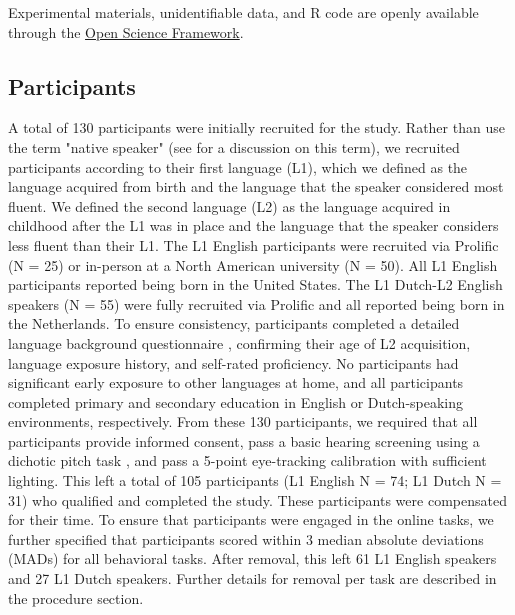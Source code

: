 Experimental materials, unidentifiable data, and R code are openly available through the 
\href{https://osf.io/wa4gv/?view_only=de113dbced6b46fab96ca8217b3c1ca6}{Open Science Framework}.


\subsection{Participants}
A total of 130 participants were initially recruited for the study. Rather than use the term "native speaker" (see \cite{Brown_Tusmagambet_Rahming_Tu_DeSalvo_Wiener_2023} for a discussion on this term), we recruited participants according to their first language (L1), which we defined as the language acquired from birth and the language that the speaker considered most fluent. We defined the second language (L2) as the language acquired in childhood after the L1 was in place and the language that the speaker considers less fluent than their L1. The L1 English participants were recruited via Prolific (N = 25) or in-person at a North American university (N = 50). All L1 English participants reported being born in the United States. The L1 Dutch-L2 English speakers (N = 55) were fully recruited via Prolific and all reported being born in the Netherlands. To ensure consistency, participants completed a detailed language background questionnaire \citep{Marian_Blumenfeld_Kaushanskaya_2007}, confirming their age of L2 acquisition, language exposure history, and self-rated proficiency. No participants had significant early exposure to other languages at home, and all participants completed primary and secondary education in English or Dutch-speaking environments, respectively. From these 130 participants, we required that all participants provide informed consent, pass a basic hearing screening using a dichotic pitch task \citep{milne_2021}, and pass a 5-point eye-tracking calibration with sufficient lighting. This left a total of 105 participants (L1 English N = 74; L1 Dutch N = 31) who qualified and completed the study. These participants were compensated for their time. To ensure that participants were engaged in the online tasks, we further specified that participants scored within 3 median absolute deviations (MADs) \citep{Leys_2013} for all behavioral tasks. After removal, this left 61 L1 English speakers and 27 L1 Dutch speakers. Further details for removal per task are described in the procedure section.

